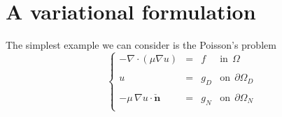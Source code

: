 \section{A variational formulation}

The simplest example we can consider is the Poisson's problem
\begin{equation}
\left \{
\begin{array}{rcll}
-\nabla \cdot \left ( \mu \nabla{u} \right) & = & f & \mbox{in}~~\Omega \\
& & & \\
u & = & g_D & \mbox{on}~~\partial{\Omega}_D \\
& & & \\
-\mu\,\nabla{u}\cdot \check{\mathbf{n}} & = & g_N & \mbox{on}~~\partial{\Omega}_N \\
\end{array}
\right.
\end{equation}


